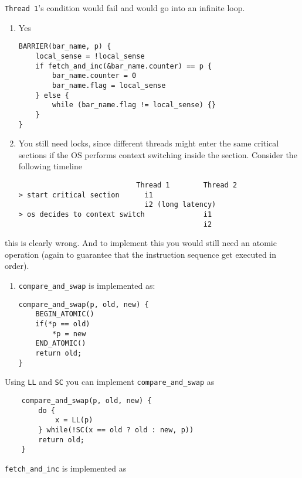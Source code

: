 \texttt{Thread 1}'s condition would fail and would go into an infinite
loop.

\begin{enumerate}
\def\labelenumi{\alph{enumi}.}
\setcounter{enumi}{1}
\item
  Yes

\begin{verbatim}
BARRIER(bar_name, p) {
    local_sense = !local_sense
    if fetch_and_inc(&bar_name.counter) == p {
        bar_name.counter = 0
        bar_name.flag = local_sense
    } else {
        while (bar_name.flag != local_sense) {}
    }
}
\end{verbatim}
\item
  You still need locks, since different threads might enter the same
  critical sections if the OS performs context switching inside the
  section. Consider the following timeline

\begin{verbatim}
                            Thread 1        Thread 2
> start critical section      i1              
                              i2 (long latency)
> os decides to context switch              i1
                                            i2
\end{verbatim}
\end{enumerate}

this is clearly wrong. And to implement this you would still need an
atomic operation (again to guarantee that the instruction sequence get
executed in order).

\begin{enumerate}
\def\labelenumi{\alph{enumi}.}
\setcounter{enumi}{3}
\item
  \texttt{compare\_and\_swap} is implemented as:

\begin{verbatim}
compare_and_swap(p, old, new) {
    BEGIN_ATOMIC()
    if(*p == old)
        *p = new
    END_ATOMIC()
    return old;
}
\end{verbatim}
\end{enumerate}

Using \texttt{LL} and \texttt{SC} you can implement
\texttt{compare\_and\_swap} as

\begin{verbatim}
    compare_and_swap(p, old, new) {
        do {
            x = LL(p)
        } while(!SC(x == old ? old : new, p))
        return old;
    }
\end{verbatim}

\texttt{fetch\_and\_inc} is implemented as

